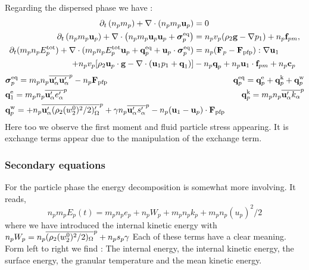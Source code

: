 Regarding the dispersed phase we have :
\begin{align}
    \label{eq:dt_hybrid_mp}
    \partial_t \left(n_p m_p\right)
    + \mathbf{\nabla}\cdot \left(n_pm_p\textbf{u}_p
    \right)
    &= 
    0\\
    \label{eq:dt_hybrid_up}
    \partial_t \left(n_p m_p \textbf{u}_p\right)
    + \mathbf{\nabla}\cdot \left(n_p
    m_p \textbf{u}_p \textbf{u}_p 
    + \bm{\sigma}_p^\text{eq}
    \right)
    &= 
    n_p v_p (\rho_2 \textbf{g}
    - \mathbf{\nabla} p_1)
    + n_p \textbf{f}_{pm},\\
    \label{eq:dt_hybrid_Ep}
    \partial_t(m_p n_pE_p^\text{tot})
    + \mathbf{\nabla}\cdot(m_pn_p E_p^\text{tot} \textbf{u}_p 
    + \textbf{q}_p^\text{eq} 
    + \textbf{u}_p \cdot \bm{\sigma}_p^\text{eq})
    &= n_p (\textbf{F}_p -\textbf{F}_\text{pfp}): \mathbf{\nabla} \textbf{u}_1 \\
    + n_p v_p [\rho_2 \textbf{u}_p\cdot  \textbf{g}
    - \mathbf{\nabla}\cdot (\textbf{u}_1 p_1 + \textbf{q}_1)]
    &-  n_p \textbf{q}_p
    +  n_p \textbf{u}_1 \cdot \textbf{f}_{pm}
    +  n_p \textbf{c}_p
\end{align}
\begin{align*}
    &\bm{\sigma}_p^\text{eq}
    = m_pn_p\overline{\textbf{u}_\alpha'\textbf{u}_\alpha'}^{p} 
    - n_p \textbf{F}_\text{pfp} 
    &\textbf{q}_p^\text{eq}
    =\textbf{q}_p^\text{e} 
    +\textbf{q}_p^\text{k}  
    +\textbf{q}_p^\text{w}  
    \\
    &\textbf{q}_1^\text{e}
    = m_p n_p\overline{\textbf{u}_\alpha' e_\alpha'}^{p} 
    &\textbf{q}_p^\text{k}
    = m_p n_p\overline{\textbf{u}_\alpha' k_\alpha}^{p} 
    \\
    &\textbf{q}_p^\text{w}
    = 
    + n_p\overline{\textbf{u}_\alpha'(\rho_2 (w^0_2)^2/2 )'_\Omega}^{p}
    + \gamma n_p\overline{\textbf{u}_\alpha' s_\alpha'}^{p}
    - n_p (\textbf{u}_1 - \textbf{u}_p)\cdot \textbf{F}_\text{pfp}
\end{align*}
Here too we observe the first moment and fluid particle stress appearing. 
It is exchange terms appear due to the manipulation of the exchange term. 

\subsubsection{Secondary equations}

For the particle phase the energy decomposition is somewhat more involving. 
It reads, 
\begin{equation*}
    n_p m_p E_p(t) 
    = m_p n_p e_p 
    + n_p W_p
    + m_p n_p k_p
    + m_p n_p (u_p)^2/2
\end{equation*}
where we have introduced the internal kinetic energy with $n_pW_p = n_p\overline{( \rho_2  (w_2^0)^2/2 )_\Omega}^{p}
+ n_p s_p \gamma$
Each of these terms have a clear meaning. 
Form left to right we find : The internal energy, the internal kinetic energy, the surface energy, the granular temperature and the mean kinetic energy. 

